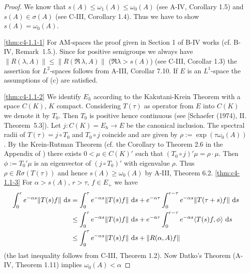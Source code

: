 \begin{proof}
We know that $s(A) \leq \omega_{1}(A) \leq \omega_{0}(A)$ (see A-IV, Corollary 1.5) and $s(A) \in \sigma(A)$ (see C-III, Corollary 1.4).
Thus we have to show $s(A) = \omega_{0}(A)$.

\ref{thm:c4-1.1-1} For AM-spaces the proof given in Section 1 of B-IV works (cf. B-IV, Remark~1.5.).
Since for positive semigroups we always have $\|R(\lambda,A)\| \leq \|R(\Re\,\lambda, A)\|$ ($\Re \lambda > s(A)$) (see C-III, Corollar 1.3) the assertion for $L^{2}$-spaces follows from A-III, Corollar 7.10.
If $E$ is an $L^{1}$-space the assumptions of (c) are satisfied.

\ref{thm:c4-1.1-2} We identify $E_{h}$ according to the Kakutani-Krein Theorem with a space $C(K)$, $K$ compact.
Considering $T(\tau)$ as operator from $E$ into $C(K)$ we denote it by $T_{0}$.
Then $T_{0}$ is positive hence continuous (see [Schaefer (1974), II. Theorem~5.3]).
Let $j \colon C(K) = E_{h} \to E$ be the canonical inclusion.
The spectral radii of $T(\tau) = j \circ T_{0}$ and $T_{0} \circ j$ coincide and are given by $\rho := \exp(\tau \omega_{0}(A))$.
By the Krein-Rutman Theorem (cf. the Corollary to Theorem 2.6 in the Appendix of \citet{schaefer:1966}) there exists $0 < \mu \in C(K)'$ such that $(T_{0} \circ j)'\mu = \rho \cdot \mu$.
Then $\phi := T_{0}'\mu$ is an eigenvector of $(j \circ T_{0})'$ with eigenvalue $\rho$.
Thus $\rho \in R\sigma(T(\tau))$ and hence $s(A) \geq \omega_{0}(A)$ by A-III, Theorem 6.2.
\ref{thm:c4-1.1-3} For $\alpha > s(A)$, $r > \tau$, $f \in E_{+}$ we have
\begin{align*}
\int_{0}^{r} e^{-\alpha s}\|T(s)f\| \, \mathop{}\!\mathrm{d}{s} &= \int_{0}^{\tau} e^{-\alpha s}\|T(s)f\| \, \mathop{}\!\mathrm{d}{s} + e^{-\alpha \tau}\int_{0}^{r-\tau} e^{-\alpha s}\|T(\tau+s)f\| \, \mathop{}\!\mathrm{d}{s} \\
&\leq \int_{0}^{\tau} e^{-\alpha s}\|T(s)f\| \, \mathop{}\!\mathrm{d}{s} + e^{-\alpha \tau}\int_{0}^{r-\tau} e^{-\alpha s}\langle T(s)f,\phi \rangle \, \mathop{}\!\mathrm{d}{s} \\
&\leq \int_{0}^{\tau} e^{-\alpha s}\|T(s)f\| \, \mathop{}\!\mathrm{d}{s} + \|R(\alpha,A)f\|
\end{align*}
(the last inequality follows from C-III, Theorem 1.2).
Now Datko's Theorem (A-IV, Theorem 1.11) implies $\omega_{0}(A) < \alpha$
\end{proof}

